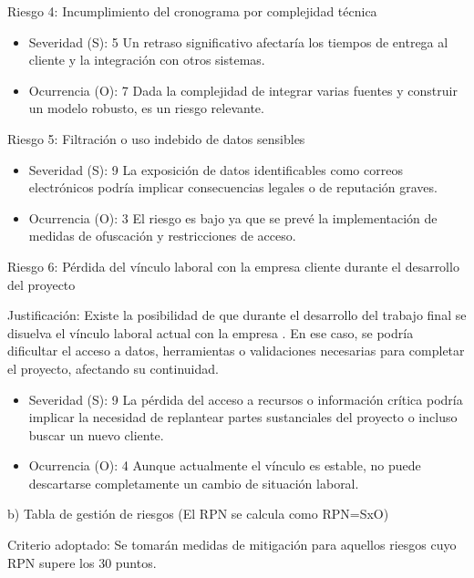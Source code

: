 \documentclass[
11pt, %
]{charter}
\begin{document}
Riesgo 4: Incumplimiento del cronograma por complejidad técnica

\begin{itemize}
\item Severidad (S): 5
Un retraso significativo afectaría los tiempos de entrega al cliente y la integración con otros sistemas.

\item Ocurrencia (O): 7
Dada la complejidad de integrar varias fuentes y construir un modelo robusto, es un riesgo relevante.
\end{itemize}

Riesgo 5: Filtración o uso indebido de datos sensibles

\begin{itemize}
\item Severidad (S): 9
La exposición de datos identificables como correos electrónicos podría implicar consecuencias legales o de reputación graves.

\item Ocurrencia (O): 3
El riesgo es bajo ya que se prevé la implementación de medidas de ofuscación y restricciones de acceso.
\end{itemize}

Riesgo 6: Pérdida del vínculo laboral con la empresa cliente durante el desarrollo del proyecto

Justificación:
Existe la posibilidad de que durante el desarrollo del trabajo final se disuelva el vínculo laboral actual con la empresa \empclientename. En ese caso, se podría dificultar el acceso a datos, herramientas o validaciones necesarias para completar el proyecto, afectando su continuidad.

\begin{itemize}
	\item Severidad (S): 9
	La pérdida del acceso a recursos o información crítica podría implicar la necesidad de replantear partes sustanciales del proyecto o incluso buscar un nuevo cliente.
	\item Ocurrencia (O): 4
	Aunque actualmente el vínculo es estable, no puede descartarse completamente un cambio de situación laboral.
\end{itemize}

b) Tabla de gestión de riesgos      (El RPN se calcula como RPN=SxO)


Criterio adoptado:
Se tomarán medidas de mitigación para aquellos riesgos cuyo RPN supere los 30 puntos.
\end{document}

